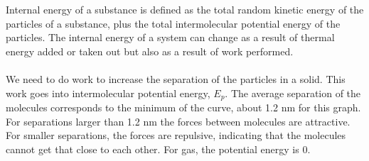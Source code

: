 \documentclass[a4paper,12pt]{article}
\begin{document}
\\\\
Internal energy of a substance is defined as the total random kinetic energy of the particles of a substance, plus the total intermolecular potential energy of the particles. The internal energy of a system can change as a result of thermal energy added or taken out but also as a result of work performed. 
\\\\
We need to do work to increase the separation of the particles in a solid. This work goes into intermolecular potential energy, $E_p$. The average separation of the molecules corresponds to the minimum of the curve, about 1.2 nm for this graph. For separations larger than 1.2 nm the forces between molecules are attractive. For smaller separations, the forces are repulsive, indicating that the molecules cannot get that close to each other. For gas, the potential energy is 0.
\begin{center}
\end{center}
\end{document}
